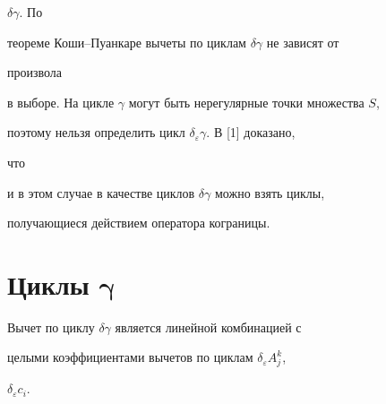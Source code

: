 $\delta\gamma$. По  


теореме Коши--Пуанкаре вычеты по циклам $\delta\gamma$ не зависят от 


произвола  


в выборе. На цикле $\gamma$ могут быть нерегулярные точки множества $S$, 


поэтому нельзя определить цикл $\delta_\varepsilon\gamma$. В [1] доказано, 


что 


и в этом случае в качестве циклов $\delta\gamma$ можно взять циклы, 


получающиеся действием оператора кограницы. 


 


\section{Циклы $\boldsymbol\gamma$} 


 


\begin{thmnonum} 


Вычет по циклу $\delta\gamma$ является линейной комбинацией с 


целыми коэффициентами вычетов по циклам $\delta_\varepsilon A^k_j$, 


$\delta_\varepsilon c_i$. 


\end{thmnonum} 


 


